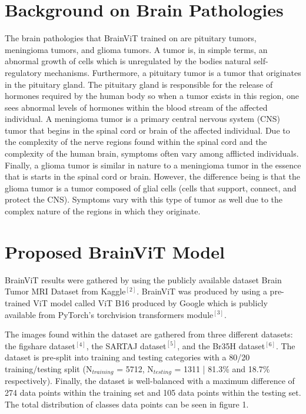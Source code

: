 \documentclass[conference]{IEEEtran}
\begin{document}
\section{Background on Brain Pathologies}
The brain pathologies that BrainViT trained on are pituitary tumors, meningioma tumors, and glioma tumors. A tumor is, in simple terms, an abnormal growth of cells which is unregulated by the bodies natural self-regulatory mechanisms. Furthermore, a pituitary tumor is a tumor that originates in the pituitary gland. The pituitary gland is responsible for the release of hormones required by the human body so when a tumor exists in this region, one sees abnormal levels of hormones within the blood stream of the affected individual. A meningioma tumor is a primary central nervous system (CNS) tumor that begins in the spinal cord or brain of the affected individual. Due to the complexity of the nerve regions found within the spinal cord and the complexity of the human brain, symptoms often vary among afflicted individuals. Finally, a glioma tumor is similar in nature to a meningioma tumor in the essence that is starts in the spinal cord or brain. However, the difference being is that the glioma tumor is a tumor composed of glial cells (cells that support, connect, and protect the CNS). Symptoms vary with this type of tumor as well due to the complex nature of the regions in which they originate.

\section{Proposed BrainViT Model}
BrainViT results were gathered by using the publicly available dataset Brain Tumor MRI Dataset from Kaggle$^{[2]}$. BrainViT was produced by using a pre-trained ViT model called ViT B16 produced by Google which is publicly available from PyTorch's torchvision transformers module$^{[3]}$.

The images found within the dataset are gathered from three different datasets: the figshare dataset$^{[4]}$, the SARTAJ dataset$^{[5]}$, and the Br35H dataset$^{[6]}$. The dataset is pre-split into training and testing categories with a 80/20 training/testing split (N$_{training}$ = 5712, N$_{testing}$ = 1311 | 81.3\% and 18.7\% respectively). Finally, the dataset is well-balanced with a maximum difference of 274 data points within the training set and 105 data points within the testing set. The total distribution of classes data points can be seen in figure 1.
\end{document}
